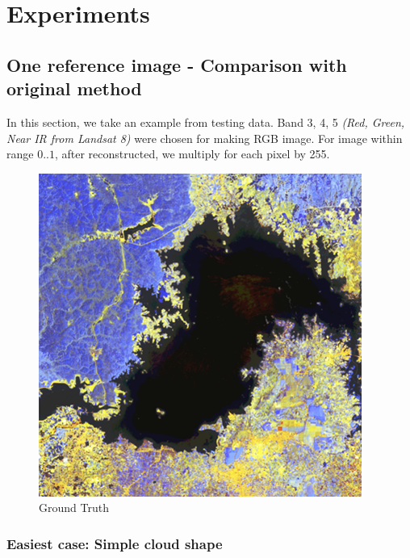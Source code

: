\section{Experiments}

\subsection{One reference image - Comparison with original method}

In this section, we take an example from testing data. Band 3, 4, 5 \textit{(Red, Green, Near IR from Landsat 8)} were chosen for making RGB image. For image within range $0..1$, after reconstructed, we multiply for each pixel by 255.
\begin{figure}[h!]
	\includegraphics[width=0.7\linewidth]{figures/groud_truth.png}
	\centering
	\caption{Ground Truth}
\end{figure}

\subsubsection{Easiest case: Simple cloud shape}

